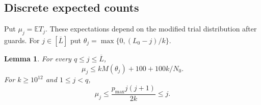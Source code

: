 \documentclass[11pt]{article}
\numberwithin{equation}{section}
\newtheorem{lemma}[theorem]{Lemma}
\theoremstyle{definition}
\newcommand{\E}{\mathbb E}
\newcommand{\cL}{\overline L}
\begin{document}
\subsection{Discrete expected counts}

Put $\mu_j=\E T_j$. These expectations depend on the modified trial
distribution after guards. For $j\in[\cL]$ put
$\theta_j=\max\{0,(L_0-j)/k\}$.

\begin{lemma}\label{lem:discrete-means}
For every $q\le j\le\cL$,
\begin{equation}\label{eq:discrete-mean-bound}
 \mu_j\le kM(\theta_j)+100+100k/N_0.
\end{equation}
For $k\ge10^{12}$ and $1\le j<q$,
\begin{equation}\label{eq:early-mean}
 \mu_j\le\frac{p_{\max}j(j+1)}{2k}\le j.
\end{equation}
\end{lemma}
\end{document}
